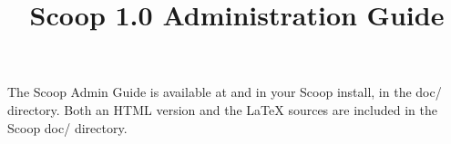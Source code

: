 \documentclass{article}
\title{Scoop 1.0 Administration Guide}
\begin{document}
\maketitle

The Scoop Admin Guide is available at  and in your Scoop install, in the doc/ directory. Both an HTML version and the LaTeX sources are included in the Scoop doc/ directory.


\latex{\tableofcontents}



\latex{\clearpage}



\latex{\clearpage}



\latex{\clearpage}



\latex{\clearpage}



\latex{\clearpage}

\appendix



\latex{\clearpage}



\latex{\clearpage}


\end{document}
